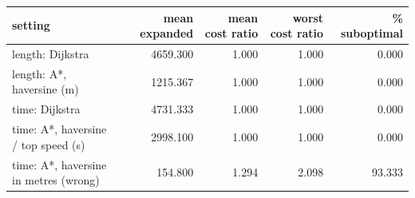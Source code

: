 \begin{tabular}{lrrrr}
\toprule
setting & mean expanded & mean cost ratio & worst cost ratio & \% suboptimal \\
\midrule
length: Dijkstra & 4659.300 & 1.000 & 1.000 & 0.000 \\
length: A*, haversine (m) & 1215.367 & 1.000 & 1.000 & 0.000 \\
time: Dijkstra & 4731.333 & 1.000 & 1.000 & 0.000 \\
time: A*, haversine / top speed (s) & 2998.100 & 1.000 & 1.000 & 0.000 \\
time: A*, haversine in metres (wrong) & 154.800 & 1.294 & 2.098 & 93.333 \\
\bottomrule
\end{tabular}

